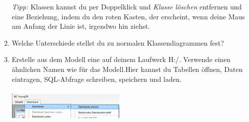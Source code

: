 \begin{enumerate}
    \emph{Tipp:} Klassen kannst du per Doppelklick und \emph{Klasse löschen} entfernen und eine Beziehung, indem du den roten Kasten, der erscheint, wenn deine Maus am Anfang der Linie ist, irgendwo hin ziehst.
    \item {} Welche Unterschiede stellst du zu normalen Klassendiagrammen fest?\\
    \item Erstelle aus dem Modell eine  auf deinem Laufwerk H:/. Verwende einen ähnlichen Namen wie für das Modell.Hier kannst du Tabellen öffnen, Daten eintragen, SQL-Abfrage schreiben, speichern und laden.\\\\
    \includegraphics[width=0.45\textwidth]{img/YDB_dbGenerieren.png}
\end{enumerate}



